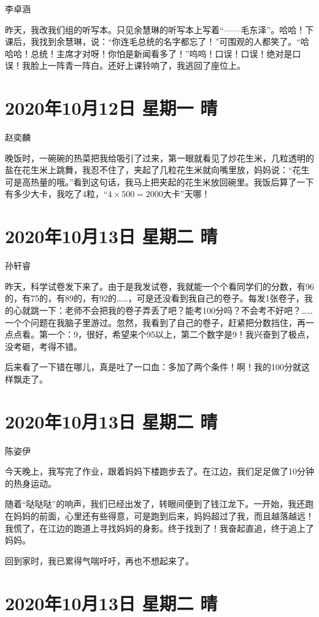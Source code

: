 李卓涵

昨天，我改我们组的听写本。只见余慧琳的听写本上写着“——毛东泽”。哈哈！下课后，我找到余慧琳，说：“你连毛总统的名字都忘了！”可围观的人都笑了。“哈哈哈！总统！主席才对呀！你怕是新闻看多了！”呜呜！口误！口误！绝对是口误！我脸上一阵青一阵白。还好上课铃响了，我逃回了座位上。

\section{2020年10月12日 星期一 晴}

赵奕麟

晚饭时，一碗碗的热菜把我给吸引了过来，第一眼就看见了炒花生米，几粒透明的盐在花生米上跳舞，我忍不住了，夹起了几粒花生米就向嘴里放，妈妈说：“花生可是高热量的哦。”看到这句话，我马上把夹起的花生米放回碗里。我饭后算了一下有多少大卡，我吃了4粒，“\(4 \times 500=2000\)大卡”天哪！

\section{2020年10月13日 星期二 晴}

孙轩睿

昨天，科学试卷发下来了。由于是我发试卷，我就能一个个看同学们的分数，有96的，有75的，有89的，有92的……，可是还没看到我自己的卷子。每发1张卷子，我的心就跳一下：老师不会把我的卷子弄丢了吧？能考100分吗？不会考不好吧？…… 一个个问题在我脑子里游过。忽然，我看到了自己的卷子，赶紧把分数挡住，再一点点看。第一个：9，很好，希望来个95以上，第二个数字是9！我兴奋到了极点，没考砸，考得不错。

后来看了一下错在哪儿，真是吐了一口血：多加了两个条件！啊！我的100分就这样飘走了。

\section{2020年10月13日 星期二 晴}

陈姿伊

今天晚上，我写完了作业，跟着妈妈下楼跑步去了。在江边，我们足足做了10分钟的热身运动。

随着“哒哒哒”的响声，我们已经出发了，转眼间便到了钱江龙下。一开始，我还跑在妈妈的前面，心里还有些得意，可是跑到后来，妈妈超过了我，而且越落越远！我慌了，在江边的跑道上寻找妈妈的身影。终于找到了！我奋起直追，终于追上了妈妈。

回到家时，我已累得气喘吁吁，再也不想起来了。

\section{2020年10月13日 星期二 晴}

